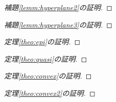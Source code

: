 \documentclass[dvipdfmx]{jsreport}
\begin{document}
\begin{proof}[補題\ref{lemm:hyperplane2}の証明]

\end{proof}

\begin{proof}[補題\ref{lemm:hyperplane3}の証明]

\end{proof}

\begin{proof}[定理\ref{theo:epi}の証明]

\end{proof}

\begin{proof}[定理\ref{theo:quasi}の証明]

\end{proof}

\begin{proof}[定理\ref{theo:convex}の証明]

\end{proof}

\begin{proof}[定理\ref{theo:convex2}の証明]

\end{proof}
\end{document}
